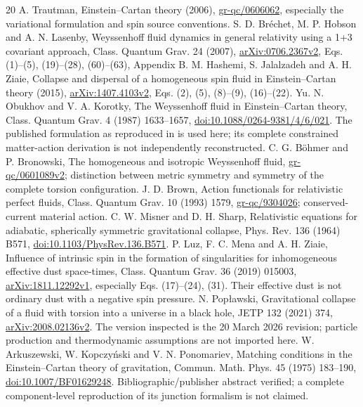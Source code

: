 \documentclass[11pt,a4paper]{article}
\begin{document}
\begin{thebibliography}{20}
 A. Trautman, Einstein--Cartan theory (2006), \href{https://arxiv.org/abs/gr-qc/0606062}{gr-qc/0606062}, especially the variational formulation and spin source conventions.
 S. D. Br\'echet, M. P. Hobson and A. N. Lasenby, Weyssenhoff fluid dynamics in general relativity using a 1+3 covariant approach, Class. Quantum Grav. 24 (2007), \href{https://arxiv.org/abs/0706.2367v2}{arXiv:0706.2367v2}, Eqs. (1)--(5), (19)--(28), (60)--(63), Appendix B.
 M. Hashemi, S. Jalalzadeh and A. H. Ziaie, Collapse and dispersal of a homogeneous spin fluid in Einstein--Cartan theory (2015), \href{https://arxiv.org/html/1407.4103v2}{arXiv:1407.4103v2}, Eqs. (2), (5), (8)--(9), (16)--(22).
 Yu. N. Obukhov and V. A. Korotky, The Weyssenhoff fluid in Einstein--Cartan theory, Class. Quantum Grav. 4 (1987) 1633--1657, \href{https://doi.org/10.1088/0264-9381/4/6/021}{doi:10.1088/0264-9381/4/6/021}. The published formulation as reproduced in \cite{BHL} is used here; its complete constrained matter-action derivation is not independently reconstructed.
 C. G. B\"ohmer and P. Bronowski, The homogeneous and isotropic Weyssenhoff fluid, \href{https://arxiv.org/abs/gr-qc/0601089v2}{gr-qc/0601089v2}; distinction between metric symmetry and symmetry of the complete torsion configuration.
 J. D. Brown, Action functionals for relativistic perfect fluids, Class. Quantum Grav. 10 (1993) 1579, \href{https://arxiv.org/abs/gr-qc/9304026}{gr-qc/9304026}; conserved-current material action.
 C. W. Misner and D. H. Sharp, Relativistic equations for adiabatic, spherically symmetric gravitational collapse, Phys. Rev. 136 (1964) B571, \href{https://doi.org/10.1103/PhysRev.136.B571}{doi:10.1103/PhysRev.136.B571}.
 P. Luz, F. C. Mena and A. H. Ziaie, Influence of intrinsic spin in the formation of singularities for inhomogeneous effective dust space-times, Class. Quantum Grav. 36 (2019) 015003, \href{https://arxiv.org/abs/1811.12292v1}{arXiv:1811.12292v1}, especially Eqs. (17)--(24), (31). Their effective dust is not ordinary dust with a negative spin pressure.
 N. Pop\l awski, Gravitational collapse of a fluid with torsion into a universe in a black hole, JETP 132 (2021) 374, \href{https://arxiv.org/html/2008.02136v2}{arXiv:2008.02136v2}. The version inspected is the 20 March 2026 revision; particle production and thermodynamic assumptions are not imported here.
 W. Arkuszewski, W. Kopczy\'nski and V. N. Ponomariev, Matching conditions in the Einstein--Cartan theory of gravitation, Commun. Math. Phys. 45 (1975) 183--190, \href{https://doi.org/10.1007/BF01629248}{doi:10.1007/BF01629248}. Bibliographic/publisher abstract verified; a complete component-level reproduction of its junction formalism is not claimed.
\end{thebibliography}
\end{document}
